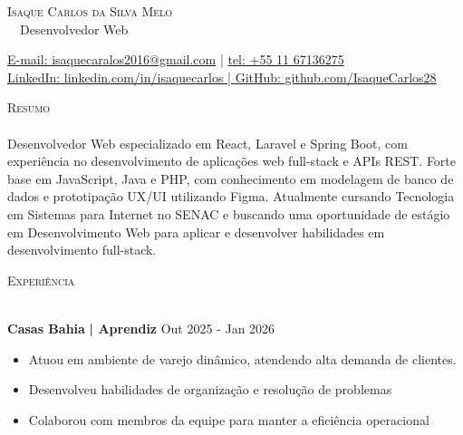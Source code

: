 \documentclass[a4paper]{article}
\newcommand{\lineunder}{
    \vspace*{-8pt} \\
    \hspace*{-18pt} \hrulefill \\
}
\newcommand{\header}[1]{
    {\hspace*{-18pt}\vspace*{6pt} \textsc{#1}}
    \vspace*{-6pt} \lineunder
}
\begin{document}
    \vspace*{-40pt}

    \vspace*{-2pt}
    \begin{center}
        {\Huge \scshape {Isaque Carlos da Silva Melo}}\\
        \vspace*{2pt}
        \ \ {\Large{Desenvolvedor Web}}\\
    \end{center}

    \vspace*{2pt}
    \href{mailto:isaquecaralos2016@gmail.com}{E-mail: isaquecaralos2016@gmail.com} | \href{tel:+55 11 67136275}{tel: +55 11 67136275}\\
    \vspace*{2pt}
    {\href{linkedin.com/in/isaquecarlos}{LinkedIn: linkedin.com/in/isaquecarlos | }}{\href{github.com/IsaqueCarlos28}{GitHub: github.com/IsaqueCarlos28}}
    \vspace*{2mm}

    \header{Resumo}
    \vspace{2mm}
    Desenvolvedor Web especializado em React, Laravel e Spring Boot, com experiência no desenvolvimento de aplicações web full-stack e APIs REST. Forte base em JavaScript, Java e PHP, com conhecimento em modelagem de banco de dados e prototipação UX/UI utilizando Figma. Atualmente cursando Tecnologia em Sistemas para Internet no SENAC e buscando uma oportunidade de estágio em Desenvolvimento Web para aplicar e desenvolver habilidades em desenvolvimento full-stack.
    \vspace{2mm}

    \header{Experiência}
    \vspace{2mm}

    \textbf{Casas Bahia}\textbf{ | Aprendiz} \hfill Out 2025 - Jan 2026\\
    \vspace{-2mm}
    \begin{itemize} \itemsep -3pt
    \item Atuou em ambiente de varejo dinâmico, atendendo alta demanda de clientes.
    \item Desenvolveu habilidades de organização e resolução de problemas
    \item Colaborou com membros da equipe para manter a eficiência operacional
    \end{itemize}
\end{document}
